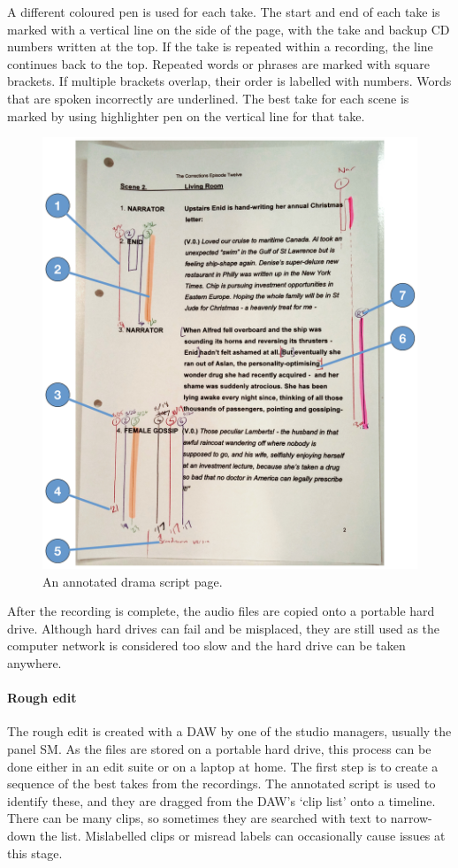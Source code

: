 A different coloured pen is used for each take. The start and end of each take is marked with a vertical line on the
side of the page, with the take and backup CD numbers written at the top. If the take is repeated within a recording,
the line continues back to the top. Repeated words or phrases are marked with square brackets. If multiple brackets
overlap, their order is labelled with numbers.  Words that are spoken incorrectly are underlined. The best take for
each scene is marked by using highlighter pen on the vertical line for that take.

\begin{figure}[p]
  \centering
  \includegraphics[width=\columnwidth]{figs/drama-markup-labelled.pdf}
  \caption{An annotated drama script page.}
  \label{fig:drama-script}
\end{figure}

After the recording is complete, the audio files are copied onto a portable hard drive. Although hard drives can fail
and be misplaced, they are still used as the computer network is considered too slow and the hard drive can be taken
anywhere.

\paragraph{Rough edit}
The rough edit is created with a DAW by one of the studio managers, usually the panel SM. As the files are stored on a
portable hard drive, this process can be done either in an edit suite or on a laptop at home. The first step is to
create a sequence of the best takes from the recordings. The annotated script is used to identify these, and they are
dragged from the DAW's `clip list' onto a timeline. There can be many clips, so sometimes they are searched with text
to narrow-down the list. Mislabelled clips or misread labels can occasionally cause issues at this stage.

